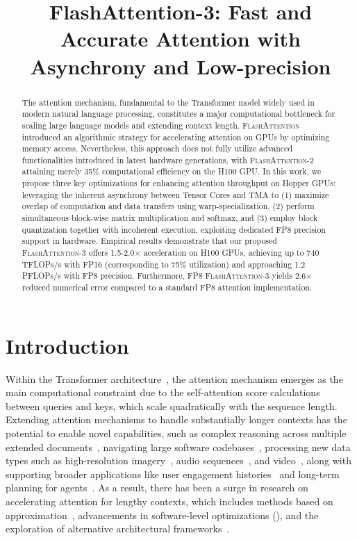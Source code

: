 \title{FlashAttention-3: Fast and Accurate Attention with Asynchrony and Low-precision}

\begin{abstract}
The attention mechanism, fundamental to the Transformer model widely used in modern natural language processing, constitutes a major computational bottleneck for scaling large language models and extending context length. 
\textsc{FlashAttention} introduced an algorithmic strategy for accelerating attention on GPUs by optimizing memory access. Nevertheless, this approach does not fully utilize advanced functionalities introduced in latest hardware generations, with \textsc{FlashAttention-2} attaining merely 35\% computational efficiency on the H100 GPU. In this work, we propose three key optimizations for enhancing attention throughput on Hopper GPUs: leveraging the inherent asynchrony between Tensor Cores and TMA to (1) maximize overlap of computation and data transfers using warp-specialization, (2) perform simultaneous block-wise matrix multiplication and softmax, and (3) employ block quantization together with incoherent execution, exploiting dedicated FP8 precision support in hardware. Empirical results demonstrate that our proposed \textsc{FlashAttention-3} offers 1.5-2.0$\times$ acceleration on H100 GPUs, achieving up to 740 TFLOPs/s with FP16 (corresponding to 75\% utilization) and approaching 1.2 PFLOPs/s with FP8 precision. Furthermore, FP8 \textsc{FlashAttention-3} yields 2.6$\times$ reduced numerical error compared to a standard FP8 attention implementation.
\end{abstract}

\section{Introduction}
\label{sec:intro}

Within the Transformer architecture~\citep{vaswani2017attention}, the attention mechanism emerges as the main computational constraint due to the self-attention score calculations between queries and keys, which scale quadratically with the sequence length. Extending attention mechanisms to handle substantially longer contexts has the potential to enable novel capabilities, such as complex reasoning across multiple extended documents~\citep{guo2021longt5,shaham2022scrolls,peng2023yarn}, navigating large software codebases~\citep{roziere2023code, li2023starcoder}, processing new data types such as high-resolution imagery~\citep{chen2022scaling}, audio sequences~\citep{gulati2020conformer}, and video~\citep{ho2022video}, along with supporting broader applications like user engagement histories~\citep{sun2019bert4rec} and long-term planning for agents~\citep{yao2022react}. As a result, there has been a surge in research on accelerating attention for lengthy contexts, which includes methods based on approximation~\citep{katharopoulos2020transformers,choromanski2020rethinking,
tay2020efficient}, advancements in software-level optimizations (\citep{rabe2021self,dao2022flashattention,kwon2023efficient}), and the exploration of alternative architectural frameworks~\citep{peng2023rwkv,sun2023retentive,gu2023mamba}.

